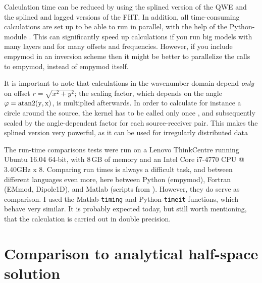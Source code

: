 \documentclass[paper]{geophysics}
\begin{document}
Calculation time can be reduced by using the splined version of the QWE and the
splined and lagged versions of the FHT. In addition, all time-consuming
calculations are set up to be able to run in parallel, with the help of the
Python-module . This can significantly speed
up calculations if you run big models with many layers and for many offsets and
frequencies. However, if you include empymod in an inversion scheme then it
might be better to parallelize the calls to empymod, instead of empymod itself.

It is important to note that calculations in the wavenumber domain depend
\emph{only} on offset $r = \sqrt{x^2+y^2}$; the scaling factor, which depends
on the angle $\varphi = \rm{atan2}(y, x)$, is multiplied afterwards. In order
to calculate for instance a circle around the source, the kernel has to be
called only once , and subsequently scaled by the
angle-dependent factor for each source-receiver pair. This makes the splined
version very powerful, as it can be used for irregularly distributed data%
%

The run-time comparisons tests were run on a Lenovo ThinkCentre running Ubuntu
16.04 64-bit, with 8\,GB of memory and an Intel Core i7-4770 CPU @ 3.40GHz x 8.
Comparing run times is always a difficult task, and between different languages
even more, here between Python (empymod), Fortran (EMmod, Dipole1D), and Matlab
(scripts from \cite{GEO.12.Key}). However, they do serve as comparison. I
used the Matlab-\texttt{timing} and Python-\texttt{timeit} functions, which
behave very similar. It is probably expected today, but still worth mentioning,
that the calculation is carried out in double precision.

\section{Comparison to analytical half-space solution}
\end{document}
